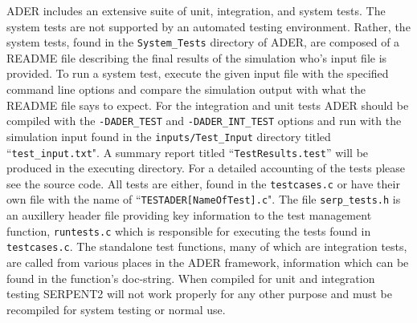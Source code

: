ADER includes an extensive suite of unit, integration, and system tests. 
The system tests are not supported by an automated testing environment. Rather,
the system tests, found in the \texttt{System\_Tests} directory of ADER, are
composed of a README file describing the final results of the simulation 
who's input file is provided. To run a system test, execute the given input
file with the specified command line options and compare the simulation output
with what the README file says to expect. For the integration and unit tests
ADER should be compiled with the \texttt{-DADER\_TEST} and 
\texttt{-DADER\_INT\_TEST} options and run with the simulation input found in 
the \texttt{inputs/Test\_Input} directory titled ``\texttt{test\_input.txt}". A
summary report titled ``\texttt{TestResults.test}'' will be produced in the
executing directory. For a detailed accounting of the tests please see the
source code. All tests are either, found in the \texttt{testcases.c} or
have their own file with the name of ``\texttt{TESTADER[NameOfTest].c}". The
file \texttt{serp\_tests.h} is an auxillery header file providing key information
to the test management function, \texttt{runtests.c} which is responsible for
executing the tests found in \texttt{testcases.c}. The standalone test
functions, many of which are integration tests, are called from various places
in the ADER framework, information which can be found in the function's
doc-string. When compiled for unit and integration testing SERPENT2 will not 
work properly for any other purpose and must be recompiled for 
system testing or normal use.
